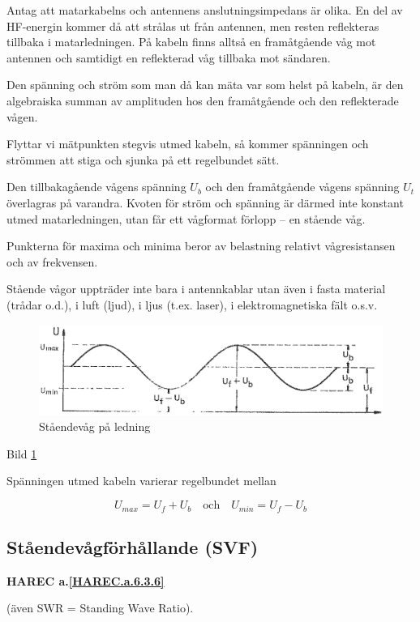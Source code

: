 Antag att matarkabelns och antennens anslutningsimpedans är olika. En
del av HF-energin kommer då att strålas ut från antennen, men resten
reflekteras tillbaka i matarledningen. På kabeln finns alltså en
framåtgående våg mot antennen och samtidigt en reflekterad våg
tillbaka mot sändaren.

Den spänning och ström som man då kan mäta var som helst på kabeln, är
den algebraiska summan av amplituden hos den framåtgående och den
reflekterade vågen.

Flyttar vi mätpunkten stegvis utmed kabeln, så kommer spänningen och
strömmen att stiga och sjunka på ett regelbundet sätt.

Den tillbakagående vågens spänning \(U_b\) och den framåtgående vågens
spänning \(U_t\) överlagras på varandra. Kvoten för ström och spänning
är därmed inte konstant utmed matarledningen, utan får ett vågformat
förlopp -- en stående våg.

Punkterna för maxima och minima beror av belastning relativt
vågresistansen och av frekvensen.

Stående vågor uppträder inte bara i antennkablar utan även i fasta
material (trådar o.d.), i luft (ljud), i ljus (t.ex. laser), i
elektromagnetiska fält o.s.v.

\begin{figure}
  \includegraphics[width=\textwidth]{images/cropped_pdfs/bild_2_6-26.pdf}
  \caption{Ståendevåg på ledning}
  \label{fig:bildII6-26}
\end{figure}

Bild \ref{fig:bildII6-26}

Spänningen utmed kabeln varierar regelbundet mellan

\[U_{max} = U_f + U_b \quad \text{och} \quad U_{min} = U_f - U_b\]

\subsection{Ståendevågförhållande (SVF)}
\textbf{
HAREC a.\ref{HAREC.a.6.3.6}\label{myHAREC.a.6.3.6}
}

(även SWR = Standing Wave Ratio).

